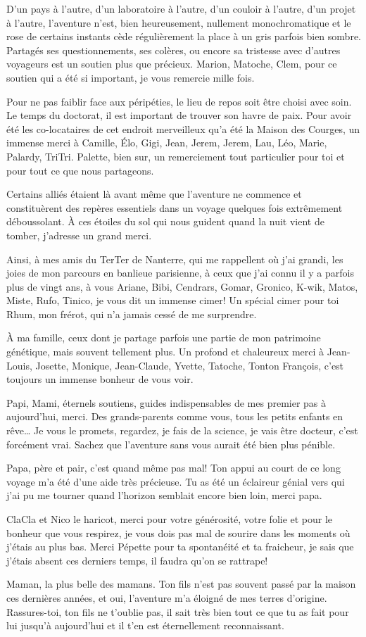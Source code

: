 D'un pays à l'autre, d'un laboratoire à l'autre, d'un couloir à l'autre,
d'un projet à l'autre, l'aventure n'est, bien heureusement, nullement
monochromatique et le rose de certains instants cède régulièrement la
place à un gris parfois bien sombre. Partagés ses questionnements, ses
colères, ou encore sa tristesse avec d'autres voyageurs est un soutien
plus que précieux. Marion, Matoche, Clem, pour ce soutien qui a été si
important, je vous remercie mille fois.

Pour ne pas faiblir face aux péripéties, le lieu de repos soit être
choisi avec soin. Le temps du doctorat, il est important de trouver son
havre de paix. Pour avoir été les co-locataires de cet endroit
merveilleux qu'a été la Maison des Courges, un immense merci à Camille,
Élo, Gigi, Jean, Jerem, Jerem, Lau, Léo, Marie, Palardy, TriTri.
Palette, bien sur, un remerciement tout particulier pour toi et pour
tout ce que nous partageons.

Certains alliés étaient là avant même que l'aventure ne commence et
constituèrent des repères essentiels dans un voyage quelques fois
extrêmement déboussolant. À ces étoiles du sol qui nous guident quand la
nuit vient de tomber, j'adresse un grand merci.

Ainsi, à mes amis du TerTer de Nanterre, qui me rappellent où j'ai
grandi, les joies de mon parcours en banlieue parisienne, à ceux que
j'ai connu il y a parfois plus de vingt ans, à vous Ariane, Bibi,
Cendrars, Gomar, Gronico, K-wik, Matos, Miste, Rufo, Tinico, je vous dit
un immense cimer! Un spécial cimer pour toi Rhum, mon frérot, qui n'a
jamais cessé de me surprendre.

À ma famille, ceux dont je partage parfois une partie de mon patrimoine
génétique, mais souvent tellement plus. Un profond et chaleureux merci à
Jean-Louis, Josette, Monique, Jean-Claude, Yvette, Tatoche, Tonton
François, c'est toujours un immense bonheur de vous voir.

Papi, Mami, éternels soutiens, guides indispensables de mes premier pas
à aujourd'hui, merci. Des grands-parents comme vous, tous les petits
enfants en rêve\ldots{} Je vous le promets, regardez, je fais de la
science, je vais être docteur, c'est forcément vrai. Sachez que
l'aventure sans vous aurait été bien plus pénible.

Papa, père et pair, c'est quand même pas mal! Ton appui au court de ce
long voyage m'a été d'une aide très précieuse. Tu as été un éclaireur
génial vers qui j'ai pu me tourner quand l'horizon semblait encore bien
loin, merci papa.

ClaCla et Nico le haricot, merci pour votre générosité, votre folie et
pour le bonheur que vous respirez, je vous dois pas mal de sourire dans
les moments où j'étais au plus bas. Merci Pépette pour ta spontanéité et
ta fraicheur, je sais que j'étais absent ces derniers temps, il faudra
qu'on se rattrape!

Maman, la plus belle des mamans. Ton fils n'est pas souvent passé par la
maison ces dernières années, et oui, l'aventure m'a éloigné de mes
terres d'origine. Rassures-toi, ton fils ne t'oublie pas, il sait très
bien tout ce que tu as fait pour lui jusqu'à aujourd'hui et il t'en est
éternellement reconnaissant.
